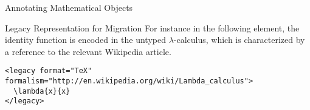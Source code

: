 \begin{omgroup}[id=annotating]{Annotating Mathematical Objects}
\begin{module}[id=legacy]
\begin{omgroup}[id=legacy]{Legacy Representation for Migration}
For instance in the following  element, the identity function is encoded
in the untyped $\lambda$-calculus, which is characterized by a reference to the relevant
Wikipedia article.

\begin{lstlisting}[index={legacy}]
<legacy format="TeX" formalism="http://en.wikipedia.org/wiki/Lambda_calculus">
  \lambda{x}{x}
</legacy>
\end{lstlisting}
\end{omgroup}
\end{module}
\end{omgroup}

